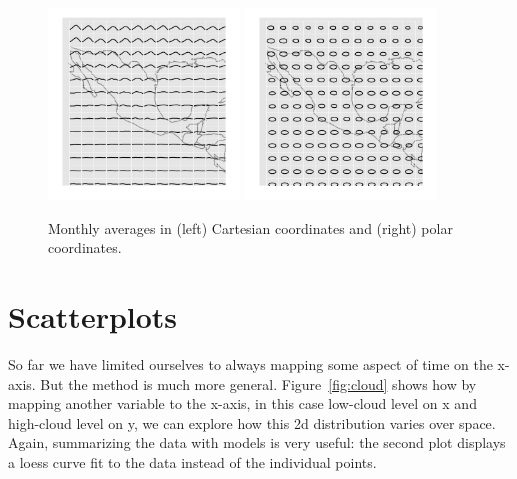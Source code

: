 \documentclass[oneside]{article}
\begin{document}
\begin{figure}[htbp]
  \centering
  \includegraphics[width=2in]{month-cartesian}
  \includegraphics[width=2in]{month-polar}
    
  \caption{Monthly averages in (left) Cartesian coordinates and (right) polar coordinates.}
  
  \label{fig:cycle}
\end{figure}

\section{Scatterplots}

So far we have limited ourselves to always mapping some aspect of time on the x-axis. But the method is much more general. Figure~\ref{fig:cloud} shows how by mapping another variable to the x-axis, in this case low-cloud level on x and high-cloud level on y, we can explore how this 2d distribution varies over space. Again, summarizing the data with models is very useful: the second plot displays a loess curve fit to the data instead of the individual points.  
\end{document}
